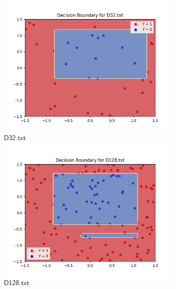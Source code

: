 \documentclass[a4paper]{article}
\theoremstyle{definition}
\newenvironment{soln}{
    \leavevmode\color{blue}\ignorespaces
}{}
\begin{document}
\begin{enumerate}
\begin{soln}
    \begin{figure}[H]
          \centering
          \begin{subfigure}{0.5\textwidth}
          \centering
          \includegraphics[width=1.1\linewidth]{Decision_Boundary_D32.png}
          \caption{$\mathsf{D32.txt}$}
          \label{fig:7sub1}
        \end{subfigure}%
        \begin{subfigure}{0.5\textwidth}
          \centering
          \includegraphics[width=1.1\linewidth]{Decision_Boundary_D128.png}
          \caption{$\mathsf{D128.txt}$}
          \label{fig:7sub2}
          \end{subfigure}
          \begin{subfigure}{0.5\textwidth}

\end{subfigure}
\end{figure}
\end{soln}
\end{enumerate}
\end{document}
